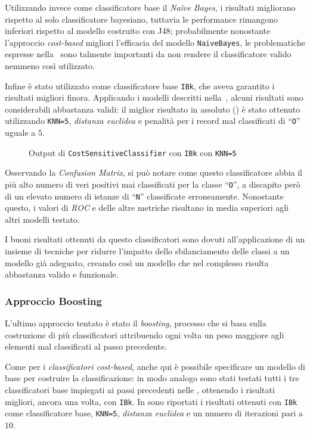 Utilizzando invece come classificatore base il \emph{Naïve Bayes}, i risultati migliorano rispetto al solo classificatore bayesiano, tuttavia le performance rimangono inferiori rispetto al modello costruito con J48;
probabilmente nonostante l'approccio \emph{cost-based} migliori l'efficacia del modello \texttt{NaiveBayes}, le problematiche espresse nella~ sono talmente importanti da non rendere il classificatore valido nemmeno così utilizzato.

Infine è stato utilizzato come classificatore base \texttt{IBk}, che aveva garantito i risultati migliori finora.
Applicando i modelli descritti nella~, alcuni risultati sono considerabili abbastanza validi:
il miglior risultato in assoluto () è stato ottenuto utilizzando \texttt{KNN=5}, \emph{distanza euclidea} e penalità per i record mal classificati di ``\texttt{O}'' uguale a \(5\).

\begin{figure}[H]
  \centering
  \caption{Output di \texttt{CostSensitiveClassifier} con \texttt{IBk} con \texttt{KNN=5}}%
  \label{fig:cost:ibk5}
\end{figure}

Osservando la \emph{Confusion Matrix}, si può notare come questo classificatore abbia il più alto numero di veri positivi mai classificati per la classe ``\texttt{O}'',
a discapito però di un elevato numero di istanze di ``\texttt{N}'' classificate erroneamente.
Nonostante questo, i valori di \emph{ROC} e delle altre metriche risultano in media superiori agli altri modelli testato.

I buoni risultati ottenuti da questo classificatori sono dovuti all'applicazione di un insieme di tecniche per ridurre l'impatto dello sbilanciamento delle classi a un modello già adeguato,
creando così un modello che nel complesso risulta abbastanza valido e funzionale.

\subsubsection{Approccio Boosting}

L'ultimo approccio tentato è stato il \emph{boosting}, processo che si basa sulla costruzione di più classificatori attribuendo ogni volta un peso maggiore agli elementi mal classificati al passo precedente.

Come per i \emph{classificatori cost-based}, anche qui è possibile specificare un modello di base per costruire la classificazione:
in modo analogo sono stati testati tutti i tre classificatori base impiegati ai passi precedenti nelle ,
ottenendo i risultati migliori, ancora una volta, con \texttt{IBk}.
In  sono riportati i risultati ottenuti con \texttt{IBk} come classificatore base, \texttt{KNN=5}, \emph{distanza euclidea} e un numero di iterazioni pari a \(10\).

